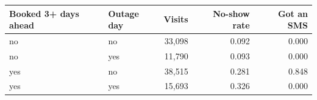 \begin{tabular}{llrrr}
\toprule
Booked 3+ days ahead & Outage day & Visits & No-show rate & Got an SMS \\
\midrule
no & no & 33,098 & 0.092 & 0.000 \\
no & yes & 11,790 & 0.093 & 0.000 \\
yes & no & 38,515 & 0.281 & 0.848 \\
yes & yes & 15,693 & 0.326 & 0.000 \\
\bottomrule
\end{tabular}
